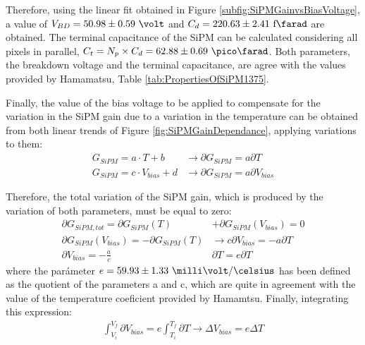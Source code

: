 Therefore, using the linear fit obtained in Figure \ref{subfig:SiPMGainvsBiasVoltage}, a value of $V_{BD}=50.98 \pm 0.59~\volt$ and $C_d{}= 220.63 \pm 2.41~\text{f}\farad$ are obtained. The terminal capacitance of the SiPM can be calculated considering all pixels in parallel, $C_{t}=N_{p}\times C_{d}=62.88 \pm 0.69~\pico\farad$. Both parameters, the breakdown voltage and the terminal capacitance, are agree with the values provided by Hamamatsu, Table \ref{tab:PropertiesOfSiPM1375}. 

Finally, the value of the bias voltage to be applied to compensate for the variation in the SiPM gain due to a variation in the temperature can be obtained from both linear trends of Figure \ref{fig:SiPMGainDependance}, applying variations to them:
\begin{equation*}
\begin{split}
G_{SiPM}=a \cdot{} T + b  &\longrightarrow \partial G_{SiPM}= a \partial T\\
G_{SiPM}=c \cdot{} V_{bias} + d &\longrightarrow \partial G_{SiPM}= a \partial V_{bias}
\label{Gain_compensationVariations}
\end{split}
\end{equation*} 

Therefore, the total variation of the SiPM gain, which is produced by the variation of both parameters, must be equal to zero:
\begin{equation*}
\begin{split}
\partial G_{SiPM, tot}= \partial G_{SiPM}(T) &+ \partial G_{SiPM}(V_{bias}) = 0\\ 
\partial G_{SiPM}(V_{bias}) = -\partial G_{SiPM}(T) &\longrightarrow c \partial V_{bias} = - a \partial T\\ 
\partial V_{bias}  = - \frac{a}{c}&\partial T = e \partial T
\label{Gain_compensation0}
\end{split}
\end{equation*} 
where the parámeter $e= 59.93 \pm 1.33~\milli\volt/\celsius $ has been defined as the quotient of the parameters a and c, which are quite in agreement with the value of the temperature coeficient provided by Hamamtsu. Finally, integrating this expression:
\begin{equation*}
\begin{split}
\int_{V_i}^{V_f}\partial V_{bias}  = e\int_{T_i}^{T_f}\partial T \longrightarrow \Delta V_{bias} = e \Delta T
\label{Gain_compensationIntegring}
\end{split}
\end{equation*} 

